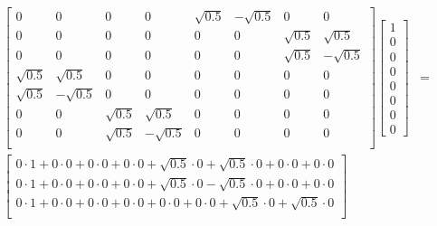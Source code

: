 \begin{figure}[H]
\begin{align*}
\begin{bmatrix}
        0           &  0          &   0          &   0          &   \sqrt{0.5}      &         -\sqrt{0.5} &   0          &   0         \\
        0           &  0          &   0          &   0          &   0               &          0          &   \sqrt{0.5} &   \sqrt{0.5}\\
        0           &  0          &   0          &   0          &   0               &          0          &   \sqrt{0.5} &  -\sqrt{0.5}\\
        \sqrt{0.5}  &  \sqrt{0.5} &   0          &   0          &   0               &          0          &   0          &   0         \\
        \sqrt{0.5}  & -\sqrt{0.5} &   0          &   0          &   0               &          0          &   0          &   0         \\
        0           &  0          &   \sqrt{0.5} &   \sqrt{0.5} &   0               &          0          &   0          &   0         \\
        0           &  0          &   \sqrt{0.5} &  -\sqrt{0.5} &   0               &          0          &   0          &   0         \\
        \end{bmatrix}
        \begin{bmatrix}
            1\\
            0\\
            0\\
            0\\
            0\\
            0\\
            0\\
            0
        \end{bmatrix}
        &=\\
        \begin{bmatrix}
            0           \cdot 1 +  0          \cdot 0 +   0          \cdot 0 +   0          \cdot 0 +   \sqrt{0.5}      \cdot 0 +          \sqrt{0.5} \cdot 0 +   0          \cdot 0 +   0         \cdot 0\\
            0           \cdot 1 +  0          \cdot 0 +   0          \cdot 0 +   0          \cdot 0 +   \sqrt{0.5}      \cdot 0           -\sqrt{0.5} \cdot 0 +   0          \cdot 0 +   0         \cdot 0\\
            0           \cdot 1 +  0          \cdot 0 +   0          \cdot 0 +   0          \cdot 0 +   0               \cdot 0 +          0          \cdot 0 +   \sqrt{0.5} \cdot 0 +   \sqrt{0.5}\cdot 0\\

\end{bmatrix}
\end{align*}
\end{figure}
